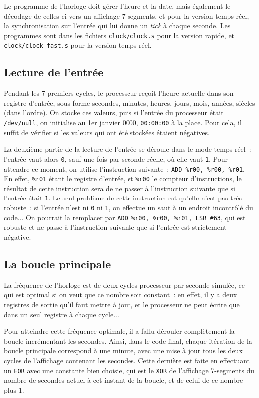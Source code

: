 \documentclass[11pt,a4paper]{article}
\begin{document}
Le programme de l'horloge doit gérer l'heure et la date, mais
également le décodage de celles-ci vers un affichage 7 segments, et
pour la version temps réel, la synchronisation sur l'entrée qui lui
donne un \textit{tick} à chaque seconde. Les programmes sont dans les
fichiers \verb!clock/clock.s! pour la version rapide, et
\verb!clock/clock_fast.s! pour la version temps réel.

\subsection{Lecture de l'entrée}

Pendant les 7 premiers cycles, le processeur reçoit l'heure actuelle
dans son registre d'entrée, sous forme secondes, minutes, heures,
jours, mois, années, siècles (dans l'ordre). On stocke ces valeurs,
puis si l'entrée du processeur était \verb!/dev/null!, on initialise au
1er janvier 0000, \verb!00:00:00! à la place. Pour cela, il suffit de
vérifier si les valeurs qui ont été stockées étaient négatives.

La deuxième partie de la lecture de l'entrée se déroule dans le mode
temps réel~: l'entrée vaut alors \verb!0!, sauf une fois par seconde
réelle, où elle vaut \verb!1!. Pour attendre ce moment, on utilise
l'instruction suivante~: \verb!ADD %r00, %r00, %r01!. En effet,
\verb!%r01! étant le registre d'entrée, et \verb!%r00! le compteur
d'instructions, le résultat de cette instruction sera de ne passer à
l'instruction suivante que si l'entrée était \verb!1!. Le seul
problème de cette instruction est qu'elle n'est pas très robuste~: si
l'entrée n'est ni \verb!0! ni \verb!1!, on effectue un saut à un
endroit incontrôlé du code... On pourrait la remplacer par
\verb!ADD %r00, %r00, %r01, LSR #63!, qui est robuste et ne passe à
l'instruction suivante que si l'entrée est strictement négative.

\subsection{La boucle principale}

La fréquence de l'horloge est de deux cycles processeur par seconde
simulée, ce qui est optimal si on veut que ce nombre soit constant~:
en effet, il y a deux registres de sortie qu'il faut mettre à jour, et
le processeur ne peut écrire que dans un seul registre à chaque cycle...

Pour atteindre cette fréquence optimale, il a fallu dérouler
complètement la boucle incrémentant les secondes. Ainsi, dans le code
final, chaque itération de la boucle principale correspond à une
minute, avec une mise à jour tous les deux cycles de l'affichage
contenant les secondes. Cette dernière est faite en effectuant un
\verb!EOR! avec une constante bien choisie, qui est le \verb!XOR! de
l'affichage 7-segments du nombre de secondes actuel à cet instant de
la boucle, et de celui de ce nombre plus 1.
\end{document}
